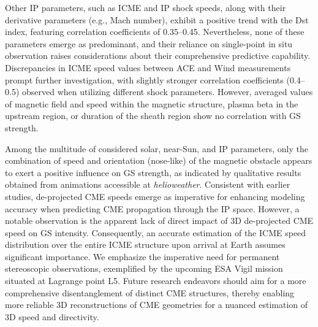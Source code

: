 Other IP parameters, such as ICME and IP shock speeds, along with their derivative parameters (e.g., Mach number), exhibit a positive trend with the Dst index, featuring correlation coefficients of 0.35–0.45. Nevertheless, none of these parameters emerge as predominant, and their reliance on single-point in situ observation raises considerations about their comprehensive predictive capability. Discrepancies in ICME speed values between ACE and Wind measurements prompt further investigation, with slightly stronger correlation coefficients (0.4–0.5) observed when utilizing different shock parameters. However, averaged values of magnetic field and speed within the magnetic structure, plasma beta in the upstream region, or duration of the sheath region show no correlation with GS strength.

Among the multitude of considered solar, near-Sun, and IP parameters, only the combination of speed and orientation (nose-like) of the magnetic obstacle appears to exert a positive influence on GS strength, as indicated by qualitative results obtained from animations accessible at \textit{helioweather}. Consistent with earlier studies, de-projected CME speeds emerge as imperative for enhancing modeling accuracy when predicting CME propagation through the IP space. However, a notable observation is the apparent lack of direct impact of 3D de-projected CME speed on GS intensity. Consequently, an accurate estimation of the ICME speed distribution over the entire ICME structure upon arrival at Earth assumes significant importance. We emphasize the imperative need for permanent stereoscopic observations, exemplified by the upcoming ESA Vigil mission situated at Lagrange point L5. Future research endeavors should aim for a more comprehensive disentanglement of distinct CME structures, thereby enabling more reliable 3D reconstructions of CME geometries for a nuanced estimation of 3D speed and directivity.































































